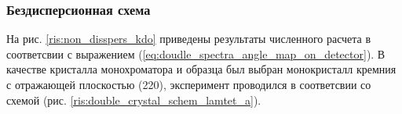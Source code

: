 \subsubsection{Бездисперсионная схема}

\label{sec:non_disspers_KDO_section}
На рис. \ref{ris:non_disspers_kdo} приведены результаты численного расчета в соответсвии
с выражением (\ref{eq:doudle_spectra_angle_map_on_detector}). В качестве кристалла монохроматора
и образца был выбран монокристалл кремния с отражающей плоскостью (220), эксперимент проводился в
соответсвии со схемой (рис. \ref{ris:double_crystal_schem_lamtet_a}).

\begin{figure}[H]
  \centering
  \hfill
  \hfill
  \hfill

\end{figure}
